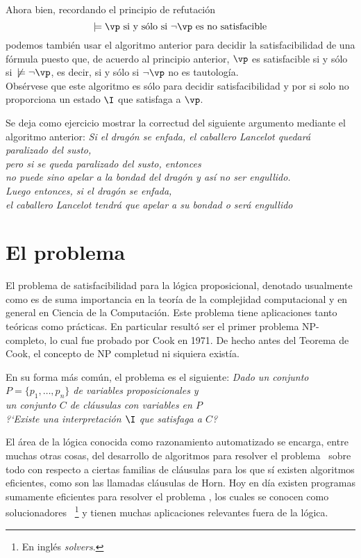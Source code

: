 \documentclass[11pt,letterpaper]{article}
\begin{document}
\noindent Ahora bien, recordando el principio de refutación 
$$\models \vp \text{ si y s\'olo si } \neg\vp \text{ es no satisfacible}$$
podemos también usar el algoritmo anterior para decidir la satisfacibilidad de 
una fórmula puesto que, de acuerdo al principio anterior, $\vp$ es satisfacible 
si y s\'olo si~$\not\models\neg \vp$, es decir, si y s\'olo si $\neg \vp$ no
es tautología. \\
Obsérvese que este algoritmo es s\'olo para decidir satisfacibilidad y por si 
solo no proporciona un estado $\I$ que satisfaga a $\vp$. 

\espc

\noindent Se deja como ejercicio mostrar la correctud del siguiente argumento 
mediante el algoritmo anterior:
\bc
\textit{Si el dragón se enfada, el caballero Lancelot quedará paralizado del 
susto,\\ pero si se queda paralizado del susto, entonces \\no puede sino apelar 
a la bondad del dragón y así no ser engullido. \\Luego entonces, si el dragón 
se enfada, \\el caballero Lancelot tendrá que apelar a su bondad o será 
engullido}
\ec

\section{El problema {\sat}}

El problema de satisfacibilidad para la lógica proposicional, denotado 
usualmente como {\sat} es de suma importancia en la teoría de la complejidad 
computacional y en general en Ciencia de la Computación. Este problema tiene 
aplicaciones tanto teóricas como prácticas. En particular resultó ser el primer 
problema NP-completo, lo cual fue probado por Cook en 1971. De hecho antes del 
Teorema de Cook, el concepto de NP completud ni siquiera existía.

\noindent En su forma más común, el problema {\sat} es el siguiente:
\bc
\textit{Dado un conjunto~$P=\{p_1,\ldots,p_n\}$ de variables proposicionales 
y\\ un conjunto $C$ de cláusulas con variables en $P$\\
 ?`Existe una interpretación $\I$ que satisfaga a $C$? }
\ec

El área de la lógica conocida como razonamiento automatizado se encarga, entre 
muchas otras cosas, del desarrollo de algoritmos para resolver el 
problema~{\sat} sobre todo con respecto a ciertas familias de cláusulas para 
los que sí existen algoritmos eficientes, como son las llamadas cláusulas de 
Horn. Hoy en día existen programas sumamente eficientes para resolver el 
problema {\sat}, los cuales se conocen como solucionadores 
{\sat}~\footnote{En inglés {\em {\sat} solvers}.} y tienen muchas 
aplicaciones relevantes fuera de la lógica.
\end{document}
